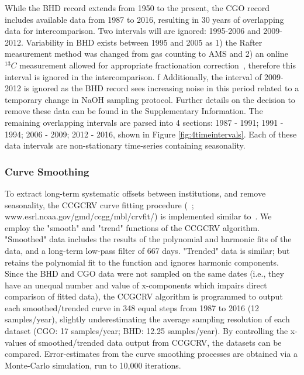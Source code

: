 \documentclass{article}
\begin{document}
While the BHD record extends from 1950 to the present, the CGO record includes available data from 1987 to 2016, resulting in 30 years of overlapping data for intercomparison. 
Two intervals will are ignored: 1995-2006 and 2009-2012.
Variability in BHD exists between 1995 and 2005 as 1) the Rafter measurement method was changed from gas counting to AMS and 2) an online $^{13}C$ measurement allowed for appropriate fractionation correction~\cite{turnbull2017, ZONDERVAN201525}, therefore this interval is ignored in the intercomparison. f
Additionally, the interval of 2009-2012 is ignored as the BHD record sees increasing noise in this period related to a temporary change in NaOH sampling protocol. Further details on the decision to remove these data can be found in the Supplementary Information. 
The remaining overlapping intervals are parsed into 4 sections: 1987 - 1991; 1991 - 1994; 2006 - 2009; 2012 - 2016, shown in Figure \ref{fig:4timeintervals}. 
Each of these data intervals are non-stationary time-series containing seasonality. 

\subsubsection{Curve Smoothing}
To extract long-term systematic offsets between institutions, and remove seasonality, the CCGCRV curve fitting procedure (~\cite{thoning1989}; www.esrl.noaa.gov/gmd/ccgg/mbl/crvfit/) is implemented similar to~\cite{turnbull2017}. We employ the "smooth" and "trend" functions of the CCGCRV algorithm. "Smoothed" data includes the results of the polynomial and harmonic fits of the data, and a long-term low-pass filter of 667 days. "Trended" data is similar; but retains the polynomial fit to the function and ignores harmonic components. 
Since the BHD and CGO data were not sampled on the same dates (i.e., they have an unequal number and value of x-components which impairs direct comparison of fitted data), the CCGCRV algorithm is programmed to output each smoothed/trended curve in 348 equal steps from 1987 to 2016 (12 samples/year), slightly underestimating the average sampling resolution of each dataset (CGO: 17 samples/year; BHD: 12.25 samples/year). By controlling the x-values of smoothed/trended data output from CCGCRV, the datasets can be compared. 
Error-estimates from the curve smoothing processes are obtained via a Monte-Carlo simulation, run to 10,000 iterations. 
\end{document}
